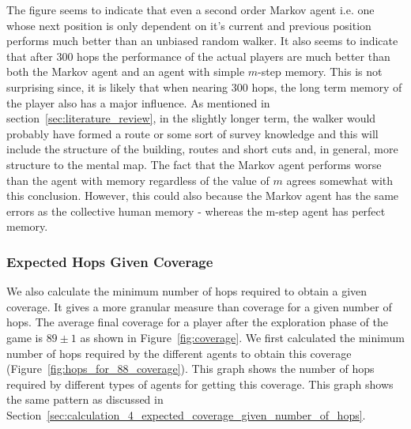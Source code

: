 The figure seems to indicate that even a second order Markov agent i.e. one whose next position is only dependent on it's current and previous position performs much better than an unbiased random walker. It also seems to indicate that after 300 hops the performance of the actual players are much better than both the Markov agent and an agent with simple $m$-step memory. This is not surprising since, it is likely that when nearing 300 hops, the long term memory of the player also has a major influence. As mentioned in section~\ref{sec:literature_review}, in the slightly longer term, the walker would probably have formed a route or some sort of survey knowledge and this will include the structure of the building, routes and short cuts and, in general, more structure to the mental map. The fact that the Markov agent performs worse than the agent with memory regardless of the value of $m$ agrees somewhat with this conclusion. However, this could also because the Markov agent has the same errors as the collective human memory - whereas the m-step agent has perfect memory.



\subsubsection{Expected Hops Given Coverage} %
\label{sec:calculation_5_expected_hops_given_coverage}

We also calculate the minimum number of hops required to obtain a given coverage. It gives a more granular measure than coverage for a given number of hops. The average final coverage for a player after the exploration phase of the game is  $89 \pm 1$ as shown in Figure~\ref{fig:coverage}. We first calculated the minimum number of hops required by the different agents to obtain this coverage (Figure~\ref{fig:hops_for_88_coverage}). This graph shows the number of hops required by different types of agents for getting this coverage. This graph shows the same pattern as discussed in Section~\ref{sec:calculation_4_expected_coverage_given_number_of_hops}.

